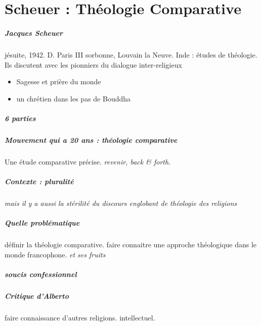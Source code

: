 \chapter{Scheuer : Théologie Comparative}


\paragraph{Jacques Scheuer} jésuite, 1942. D. Paris III sorbonne, Louvain la Neuve. Inde : études de théologie. Ils discutent avec les pionniers du dialogue inter-religieux
\begin{itemize}
    \item Sagesse et prière du monde
    \item un chrétien dans les pas de Bouddha
\end{itemize}

\paragraph{6 parties} 

\paragraph{Mouvement qui a 20 ans : théologie comparative} Une étude comparative précise. \textit{revenir, back \& forth}. 

\paragraph{Contexte : pluralité} \textit{mais il y a aussi la stérilité du discours englobant de théologie des religions}

\paragraph{Quelle problématique} {définir la théologie comparative}. faire connaitre une approche théologique dans le monde francophone. \textit{et ses fruits}

\paragraph{soucis confessionnel}




\paragraph{Critique d'Alberto} faire connaissance d'autres religions. intellectuel. 
